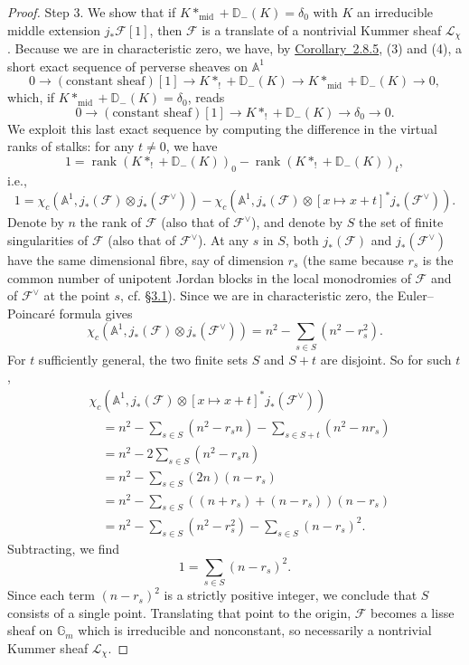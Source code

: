 \begin{proof}
Step 3. We show that if
\(K*_{\mathrm{mid}}+\mathbb{D}_{-}(K)=\delta_0\) with \(K\) an irreducible
middle extension \(j_*\mathcal{F}[1]\), then \(\mathcal{F}\) is a translate of
a nontrivial Kummer sheaf \(\mathcal{L}_\chi\). Because we are in characteristic
zero, we have, by \hyperref[cor:2.8.5]{Corollary~2.8.5}, (3) and (4), a
short exact sequence of perverse sheaves on \(\mathbb{A}^1\)
\[
  0\to(\text{constant sheaf})[1]\to K*_!+\mathbb{D}_{-}(K)
  \to K*_{\mathrm{mid}}+\mathbb{D}_{-}(K)\to 0,
\]
which, if \(K*_{\mathrm{mid}}+\mathbb{D}_{-}(K)=\delta_0\), reads
\[
  0\to(\text{constant sheaf})[1]\to K*_!+\mathbb{D}_{-}(K)\to\delta_0\to 0.
\]
We exploit this last exact sequence by computing the difference in the virtual
ranks of stalks: for any \(t\neq 0\), we have
\[
  1=\operatorname{rank}(K*_!+\mathbb{D}_{-}(K))_0
    -\operatorname{rank}(K*_!+\mathbb{D}_{-}(K))_t,
\]
i.e.,
\[
  1=
  \chi_c(\mathbb{A}^1,j_*(\mathcal{F})\otimes j_*(\mathcal{F}^{\vee}))
  -
  \chi_c(\mathbb{A}^1,j_*(\mathcal{F})\otimes[x\mapsto x+t]^*j_*(\mathcal{F}^{\vee})).
\]
Denote by \(n\) the rank of \(\mathcal{F}\) (also that of
\(\mathcal{F}^{\vee}\)), and denote by \(S\) the set of finite singularities of
\(\mathcal{F}\) (also that of \(\mathcal{F}^{\vee}\)). At any \(s\) in \(S\),
both \(j_*(\mathcal{F})\) and \(j_*(\mathcal{F}^{\vee})\) have the same
dimensional fibre, say of dimension \(r_s\) (the same because \(r_s\) is the
common number of unipotent Jordan blocks in the local monodromies of
\(\mathcal{F}\) and of \(\mathcal{F}^{\vee}\) at the point \(s\), cf.
\hyperref[sec:3.1]{\S3.1}). Since we are in characteristic zero, the
Euler--Poincaré formula gives
\[
  \chi_c(\mathbb{A}^1,j_*(\mathcal{F})\otimes j_*(\mathcal{F}^{\vee}))
  =
  n^2-\sum_{s\in S}(n^2-r_s^2).
\]
For \(t\) sufficiently general, the two finite sets \(S\) and \(S+t\) are
disjoint. So for such \(t\),
\[
  \begin{aligned}
  &\chi_c(\mathbb{A}^1,j_*(\mathcal{F})\otimes
    [x\mapsto x+t]^*j_*(\mathcal{F}^{\vee}))\\
  &\quad=
  n^2-\sum_{s\in S}(n^2-r_sn)-\sum_{s\in S+t}(n^2-nr_s)\\
  &\quad=
  n^2-2\sum_{s\in S}(n^2-r_sn)\\
  &\quad=
  n^2-\sum_{s\in S}(2n)(n-r_s)\\
  &\quad=
  n^2-\sum_{s\in S}((n+r_s)+(n-r_s))(n-r_s)\\
  &\quad=
  n^2-\sum_{s\in S}(n^2-r_s^2)-\sum_{s\in S}(n-r_s)^2.
  \end{aligned}
\]
Subtracting, we find
\[
  1=\sum_{s\in S}(n-r_s)^2.
\]
Since each term \((n-r_s)^2\) is a strictly positive integer, we conclude that
\(S\) consists of a single point. Translating that point to the origin,
\(\mathcal{F}\) becomes a lisse sheaf on \(\mathbb{G}_m\) which is irreducible
and nonconstant, so necessarily a nontrivial Kummer sheaf
\(\mathcal{L}_\chi\).
\end{proof}

